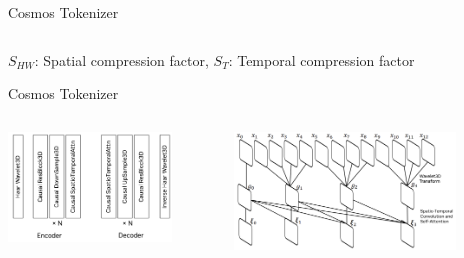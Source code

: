 \documentclass{beamer}
\begin{document}
\begin{frame}[t]{Cosmos Tokenizer}
\begin{columns}[t]
\begin{column}{.5\textwidth}
\begin{center}
			\end{center}
		\end{column}
	\end{columns}
    $S_{HW}$: Spatial compression factor, $S_T$: Temporal compression factor
\end{frame}

\begin{frame}[t]{Cosmos Tokenizer}
    \vspace{-2em}
	\begin{columns}[t]
		\begin{column}{.5\textwidth}
            \begin{center}
                \includegraphics[width=0.8\textwidth]{./img/tokenizer_2.png}
            \end{center}
		\end{column}
		\begin{column}{.5\textwidth}
            \begin{center}
                \includegraphics[width=0.8\textwidth]{./img/tokenizer_3.png}
            \end{center}
		\end{column}
	\end{columns}
    \small
\end{frame}
\end{document}
